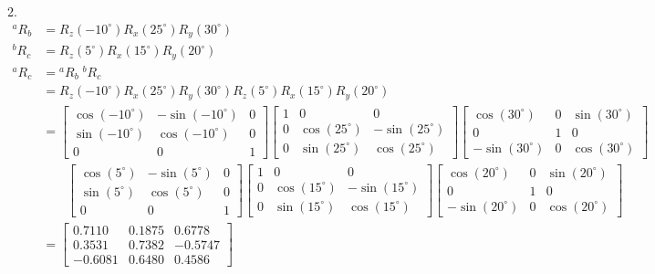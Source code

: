 \documentclass[UTF8, 13pt]{ctexart}
\begin{document}
2.
\[
\begin{aligned}
    {}^a R_b &= R_z(-10^\circ) R_x(25^\circ) R_y(30^\circ) \\
    {}^b R_c &= R_z(5^\circ) R_x(15^\circ) R_y(20^\circ) \\
    {}^a R_c &= {}^a R_b \; {}^b R_c \\
            &= R_z(-10^\circ) R_x(25^\circ) R_y(30^\circ) R_z(5^\circ) R_x(15^\circ) R_y(20^\circ) \\
            &= \begin{bmatrix}
                    \cos(-10^\circ) & -\sin(-10^\circ) & 0 \\
                    \sin(-10^\circ) &  \cos(-10^\circ) & 0 \\
                    0 & 0 & 1
                \end{bmatrix}
                \begin{bmatrix}
                    1 & 0 & 0 \\
                    0 & \cos(25^\circ) & -\sin(25^\circ) \\
                    0 & \sin(25^\circ) & \cos(25^\circ)
                \end{bmatrix}
                \begin{bmatrix}
                    \cos(30^\circ) & 0 & \sin(30^\circ) \\
                    0 & 1 & 0 \\
                    -\sin(30^\circ) & 0 & \cos(30^\circ)
                \end{bmatrix} \\[6pt]
                &\phantom{=} \;\;
                \begin{bmatrix}
                    \cos(5^\circ) & -\sin(5^\circ) & 0 \\
                    \sin(5^\circ) &  \cos(5^\circ) & 0 \\
                    0 & 0 & 1
                \end{bmatrix}
                \begin{bmatrix}
                    1 & 0 & 0 \\
                    0 & \cos(15^\circ) & -\sin(15^\circ) \\
                    0 & \sin(15^\circ) & \cos(15^\circ)
                \end{bmatrix}
                \begin{bmatrix}
                    \cos(20^\circ) & 0 & \sin(20^\circ) \\
                    0 & 1 & 0 \\
                    -\sin(20^\circ) & 0 & \cos(20^\circ)
                \end{bmatrix} \\
            &= \begin{bmatrix}
                    0.7110 & 0.1875 & 0.6778 \\
                    0.3531 & 0.7382 & -0.5747 \\
                    -0.6081 & 0.6480 & 0.4586
                \end{bmatrix}
\end{aligned}
\]
\vspace{1em}
\end{document}
